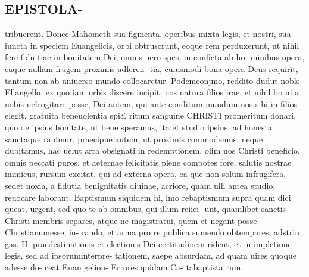 \documentclass{article}
\begin{document}
\begin{pages}
\section*{EPISTOLA- }\pstart tribuerent. Donec Mahometh sua figmenta, operibus mixta legis, et nostri, sua iuncta in speciem Euangelicis, orbi obtruscrunt, eoque rem perduxerunt, ut nihil fere fidu tiae in bonitatem Dei, omnis uero spes, in conficta ab ho- minibus opera, eaque nullam frugem proximis adferen- tia, cuiusmodi bona opera Deus requirit, tantum non ab uniuerso mundo collocaretur.  \pend\pstart  Podemconjmo, reddito dudut nobls Ellangello, ex quo iam orbis discere incipit, nos natura filios irae, et nihil bo ni a nobis uelcogitare posse, Dei autem, qui ante conditum mundum nos sibi in filios elegit, gratuita beneuolentia spi£ ritum sanguine CHRISTI promeritum donari, quo de ipsius bonitate, ut bene speramus, ita et studio ipsius, ad honesta sanctaque rapimur, praecipue autem, ut proximis commodemus, neque dubitamus, hac uelut arra obsignati in redemptionem, olim nos Christi beneficio, omnis peccati puros, et aeternae felicitatis plene compotes fore, salutis nostrae inimicus, rursum excitat, qui ad externa opera, ea que non solum infrugifera, sedet noxia, a fidutia benignitatis diuinae, acriore, quam ulli antea studio, reuocare laborant. Baptismum siquidem hi, imo rebaptismum supra quam dici queat, urgent, sed quo te ab omnibus, qui illum reiici- unt, quamlibet sanctis Christi membris separes, atque ne magistratui, quem et negant posse Christianumesse, iu- rando, et arma pro re publica sumendo obtempares, adstrin gas. Hi praedestinationis et electionis Dei certitudinem rident, et in impletione legis, sed ad ipsoruminterpre- tationem, saepe absurdam, ad quam uires quoque adesse  \pendQuiu do- ceat Euan gelion- Errores quidam Ca- tabaptista rum. 

\end{pages}
\end{document}
